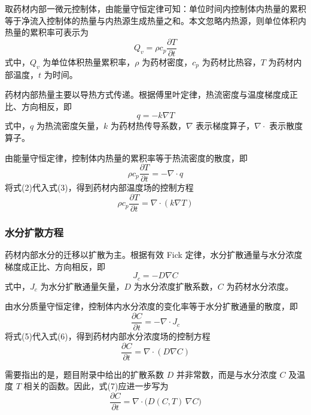 \documentclass[withoutpreface,bwprint]{cumcm_thesis}
\begin{document}
取药材内部一微元控制体，由能量守恒定律可知：单位时间内控制体内热量的累积等于净流入控制体的热量与内热源生成热量之和。本文忽略内热源，则单位体积内热量的累积率可表示为
\begin{equation}
Q_v = \rho c_p \frac{\partial T}{\partial t}
\end{equation}
式中，\(Q_v\) 为单位体积热量累积率，\(\rho\) 为药材密度，\(c_p\) 为药材比热容，\(T\) 为药材内部温度，\(t\) 为时间。

药材内部热量主要以导热方式传递。根据傅里叶定律，热流密度与温度梯度成正比、方向相反，即
\begin{equation}
q = -k \nabla T
\end{equation}
式中，\(q\) 为热流密度矢量，\(k\) 为药材热传导系数，\(\nabla\) 表示梯度算子，\(\nabla \cdot\) 表示散度算子。

由能量守恒定律，控制体内热量的累积率等于热流密度的散度，即
\begin{equation}
\rho c_p \frac{\partial T}{\partial t} = -\nabla \cdot q
\end{equation}
将式(2)代入式(3)，得到药材内部温度场的控制方程
\begin{equation}
\rho c_p \frac{\partial T}{\partial t} = \nabla \cdot (k \nabla T)
\end{equation}

\subsubsection{水分扩散方程}

药材内部水分的迁移以扩散为主。根据有效 Fick 定律，水分扩散通量与水分浓度梯度成正比、方向相反，即
\begin{equation}
J_c = -D \nabla C
\end{equation}
式中，\(J_c\) 为水分扩散通量矢量，\(D\) 为水分浓度扩散系数，\(C\) 为药材水分浓度。

由水分质量守恒定律，控制体内水分浓度的变化率等于水分扩散通量的散度，即
\begin{equation}
\frac{\partial C}{\partial t} = -\nabla \cdot J_c
\end{equation}
将式(5)代入式(6)，得到药材内部水分浓度场的控制方程
\begin{equation}
\frac{\partial C}{\partial t} = \nabla \cdot (D \nabla C)
\end{equation}

需要指出的是，题目附录中给出的扩散系数 \(D\) 并非常数，而是与水分浓度 \(C\) 及温度 \(T\) 相关的函数。因此，式(7)应进一步写为
\begin{equation}
\frac{\partial C}{\partial t} = \nabla \cdot \bigl( D(C,T) \, \nabla C \bigr)
\end{equation}
\end{document}
